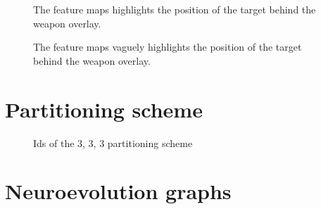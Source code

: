 \begin{figure}[H]
	\begin{center}
	\begin{scriptsize}
		\sffamily
		
	\end{scriptsize}
	\end{center}
	\caption[Feature maps]{The feature maps highlights the position of the target behind the weapon overlay.}
\end{figure}

\begin{figure}[H]
	\begin{center}
	\begin{scriptsize}
		\sffamily
		
	\end{scriptsize}
	\end{center}
	\caption[Feature maps]{The feature maps vaguely highlights the position of the target behind the weapon overlay.}
\end{figure}


\section{Partitioning scheme}

\begin{figure}[H]
	\begin{scriptsize}
		\sffamily
		\def\svgwidth{\textwidth}
		
	\end{scriptsize}
	\caption{Ids of the 3, 3, 3 partitioning scheme}
	\label{fig:ids}
\end{figure}

\section{Neuroevolution graphs}
\label{sec:neuroevolution-graphs}



